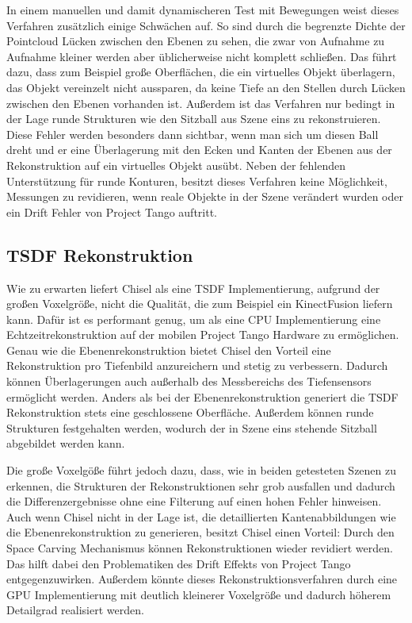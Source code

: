 In einem manuellen und damit dynamischeren Test mit Bewegungen weist dieses Verfahren zusätzlich einige Schwächen auf. So sind durch die begrenzte Dichte der Pointcloud Lücken zwischen den Ebenen zu sehen, die zwar von Aufnahme zu Aufnahme kleiner werden aber üblicherweise nicht komplett schließen. Das führt dazu, dass zum Beispiel große Oberflächen, die ein virtuelles Objekt überlagern, das Objekt vereinzelt nicht aussparen, da keine Tiefe an den Stellen durch Lücken zwischen den Ebenen vorhanden ist. Außerdem ist das Verfahren nur bedingt in der Lage runde Strukturen wie den Sitzball aus Szene eins zu rekonstruieren. Diese Fehler werden besonders dann sichtbar, wenn man sich um diesen Ball dreht und er eine Überlagerung mit den Ecken und Kanten der Ebenen aus der Rekonstruktion auf ein virtuelles Objekt ausübt. Neben der fehlenden Unterstützung für runde Konturen, besitzt dieses Verfahren keine Möglichkeit, Messungen zu revidieren, wenn reale Objekte in der Szene verändert wurden oder ein Drift Fehler von Project Tango auftritt.

\subsection*{TSDF Rekonstruktion}

Wie zu erwarten liefert Chisel als eine TSDF Implementierung, aufgrund der großen Voxelgröße, nicht die Qualität, die zum Beispiel ein KinectFusion liefern kann. Dafür ist es performant genug, um als eine CPU Implementierung eine Echtzeitrekonstruktion auf der mobilen Project Tango Hardware zu ermöglichen. Genau wie die Ebenenrekonstruktion bietet Chisel den Vorteil eine Rekonstruktion pro Tiefenbild anzureichern und stetig zu verbessern. Dadurch können Überlagerungen auch außerhalb des Messbereichs des Tiefensensors ermöglicht werden. Anders als bei der Ebenenrekonstruktion generiert die TSDF Rekonstruktion stets eine geschlossene Oberfläche. Außerdem können runde Strukturen festgehalten werden, wodurch der in Szene eins stehende Sitzball abgebildet werden kann.

Die große Voxelgöße führt jedoch dazu, dass, wie in beiden getesteten Szenen zu erkennen, die Strukturen der Rekonstruktionen sehr grob ausfallen und dadurch die Differenzergebnisse ohne eine Filterung auf einen hohen Fehler hinweisen. Auch wenn Chisel nicht in der Lage ist, die detaillierten Kantenabbildungen wie die Ebenenrekonstruktion zu generieren, besitzt Chisel einen Vorteil: Durch den Space Carving Mechanismus können Rekonstruktionen wieder revidiert werden. Das hilft dabei den Problematiken des Drift Effekts von Project Tango entgegenzuwirken. Außerdem könnte dieses Rekonstruktionsverfahren durch eine GPU Implementierung mit deutlich kleinerer Voxelgröße und dadurch höherem Detailgrad realisiert werden.

